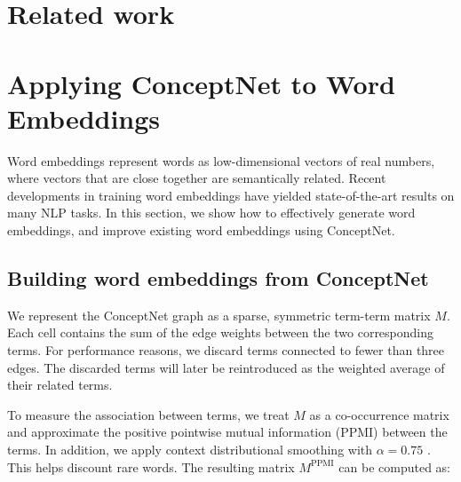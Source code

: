 \documentclass[letterpaper]{article}
\begin{document}
\section{Related work}


\section{Applying ConceptNet to Word Embeddings}
\label{applying-conceptnet-to-word-embeddings}

Word embeddings represent words as low-dimensional vectors of real numbers,
where vectors that are close together are semantically related. Recent
developments in training word embeddings have yielded state-of-the-art results
on many NLP tasks. In this section, we show how to effectively generate
word embeddings, and improve existing word embeddings using ConceptNet.

\subsection{Building word embeddings from ConceptNet}


We represent the ConceptNet graph as a sparse, symmetric term-term matrix $M$.
Each cell contains the sum of the edge weights between the two corresponding
terms. For performance reasons, we discard terms connected to fewer than three
edges. The discarded terms will later be reintroduced as the weighted average of
their related terms.

To measure the association between terms, we treat $M$ as a co-occurrence
matrix and approximate the positive pointwise mutual information (PPMI) between
the terms. In addition, we apply context distributional smoothing with
$\alpha=0.75$ \cite{levy2015embeddings}. This helps discount rare words. The
resulting matrix $M^\text{PPMI}$ can be computed as:
\end{document}
